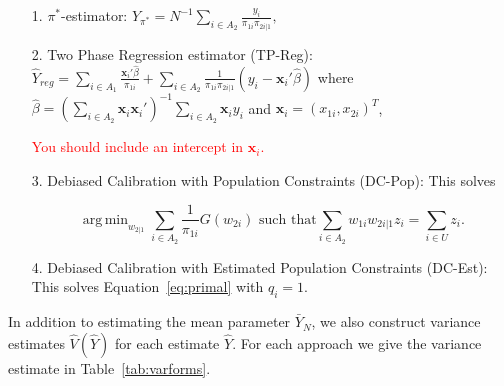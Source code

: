 \documentclass[12pt]{article}
\DeclareMathOperator*{\argmin}{arg\,min}
\renewcommand{\bf}[1]{\mathbf{#1}}
\begin{document}
\begin{itemize}
  \item[1.] $\pi^*$-estimator: $\hat Y_{\pi^*} = N^{-1} \sum_{i \in A_2}
    \frac{y_i}{\pi_{1i} \pi_{2i|1}},$
  \item[2.] Two Phase Regression estimator (TP-Reg): 
    $\hat Y_{reg} = \sum_{i \in A_1} \frac{\bf x_i' \hat \beta}{\pi_{1i}} + 
    \sum_{i \in A_2} \frac{1}{\pi_{1i}\pi_{2i|1}}(y_i - \bf x_i' \hat \beta)$ 
    where $\hat \beta = 
    \left(\sum_{i \in A_2} \bf x_i \bf x_i'\right)^{-1} \sum_{i \in A_2} \bf x_i y_i$
    and $\bf x_i = (x_{1i}, x_{2i})^T$,

    \textcolor{red}{You should include an intercept in $\bf x_i$. }
  \item[3.] Debiased Calibration with Population Constraints (DC-Pop): This 
    solves 

  \begin{equation}
    \argmin_{w_{2|1}} \sum_{i \in A_2} \frac{1}{\pi_{1i}} G(w_{2i})
    \text{ such that}
    \sum_{i \in A_2} w_{1i} w_{2i|1} z_i = \sum_{i \in U} z_i.
  \end{equation}

  \item[4.] Debiased Calibration with Estimated Population Constraints (DC-Est):
    This solves Equation~\eqref{eq:primal} with $q_i = 1$.
\end{itemize}

In addition to estimating the mean parameter $\bar Y_N$, we also construct
variance estimates $\hat V(\hat Y)$ for each estimate $\hat Y$. For each
approach we give the variance estimate in Table~\ref{tab:varforms}.
\end{document}
